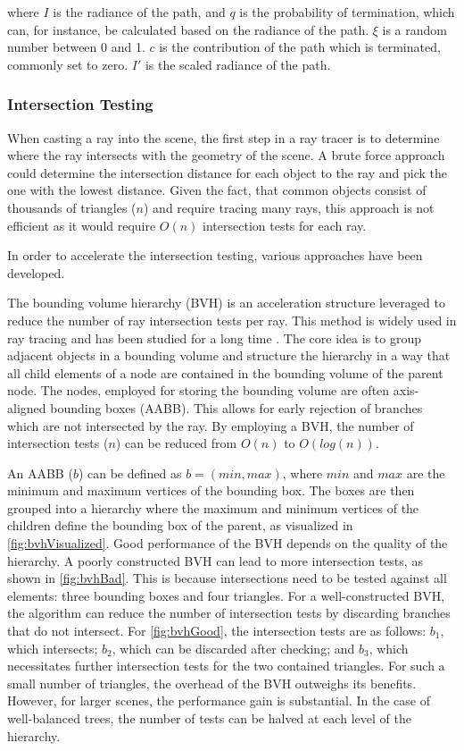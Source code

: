 where $I$ is the radiance of the path, and $q$ is the probability of termination, which can, for instance, be calculated based on the radiance of the path. $\xi$ is a random number between 0 and 1. $c$ is the contribution of the path which is terminated, commonly set to zero. $I'$ is the scaled radiance of the path. \cite{Pharr_Physically_Based_Rendering_2023}

\subsubsection{Intersection Testing}

When casting a ray into the scene, the first step in a ray tracer is to determine where the ray intersects with the geometry of the scene. A brute force approach could determine the intersection distance for each object to the ray and pick the one with the lowest distance. Given the fact, that common objects consist of thousands of triangles ($n$) and require tracing many rays, this approach is not efficient as it would require $O(n)$ intersection tests for each ray.

In order to accelerate the intersection testing, various approaches have been developed.

The bounding volume hierarchy (\gls{BVH}) is an acceleration structure leveraged to reduce the number of ray intersection tests per ray. This method is widely used in ray tracing and has been studied for a long time \cite{rubinWhittedBvh}. The core idea is to group adjacent objects in a bounding volume and structure the hierarchy in a way that all child elements of a node are contained in the bounding volume of the parent node. The nodes, employed for storing the bounding volume are often axis-aligned bounding boxes (\gls{AABB}). This allows for early rejection of branches which are not intersected by the ray. By employing a \gls{BVH}, the number of intersection tests ($n$) can be reduced from $O(n)$ to $O(log(n))$.

An \gls{AABB} ($b$) can be defined as $b = (min, max)$, where $min$ and $max$ are the minimum and maximum vertices of the bounding box. The boxes are then grouped into a hierarchy where the maximum and minimum vertices of the children define the bounding box of the parent, as visualized in \autoref{fig:bvhVisualized}. Good performance of the \gls{BVH} depends on the quality of the hierarchy. A poorly constructed \gls{BVH} can lead to more intersection tests, as shown in \autoref{fig:bvhBad}. This is because intersections need to be tested against all elements: three bounding boxes and four triangles. For a well-constructed \gls{BVH}, the algorithm can reduce the number of intersection tests by discarding branches that do not intersect. For \autoref{fig:bvhGood}, the intersection tests are as follows: $b_1$, which intersects; $b_2$, which can be discarded after checking; and $b_3$, which necessitates further intersection tests for the two contained triangles. For such a small number of triangles, the overhead of the \gls{BVH} outweighs its benefits. However, for larger scenes, the performance gain is substantial. In the case of well-balanced trees, the number of tests can be halved at each level of the hierarchy.

